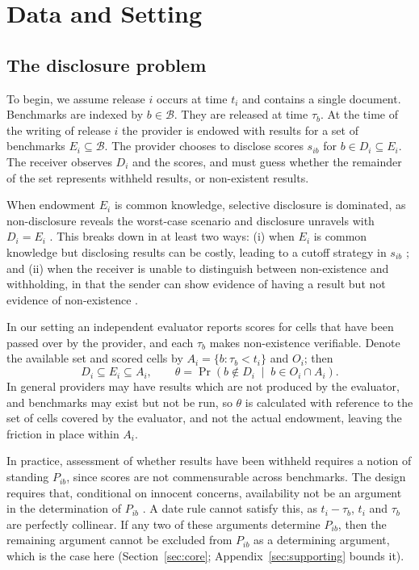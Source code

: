 \section{Data and Setting}\label{sec:data}

\subsection{The disclosure problem}\label{sec:data-model}

To begin, we assume release $i$ occurs at time $t_i$ and contains a single document. Benchmarks are indexed by $b \in \mathcal{B}$. They are released at time $\tau_b$. At the time of the writing of release $i$ the provider is endowed with results for a set of benchmarks $E_i \subseteq \mathcal{B}$. The provider chooses to disclose scores $s_{ib}$ for $b \in D_i \subseteq E_i$. The receiver observes $D_i$ and the scores, and must guess whether the remainder of the set represents withheld results, or non-existent results.

When endowment $E_i$ is common knowledge, selective disclosure is dominated, as non-disclosure reveals the worst-case scenario and disclosure unravels with $D_i = E_i$ \citep{grossman1981,milgrom1981}. This breaks down in at least two ways: (i) when $E_i$ is common knowledge but disclosing results can be costly, leading to a cutoff strategy in $s_{ib}$ \citep{verrecchia1983}; and (ii) when the receiver is unable to distinguish between non-existence and withholding, in that the sender can show evidence of having a result but not evidence of non-existence \citep[Section 3]{dye1985}.

In our setting an independent evaluator reports scores for cells that have been passed over by the provider, and each $\tau_b$ makes non-existence verifiable. Denote the available set and scored cells by $A_i = \{b : \tau_b < t_i\}$ and $O_i$; then
\[
D_i \subseteq E_i \subseteq A_i, \qquad \theta = \Pr\!\left(b \notin D_i \;\middle|\; b \in O_i \cap A_i\right).
\]
In general providers may have results which are not produced by the evaluator, and benchmarks may exist but not be run, so $\theta$ is calculated with reference to the set of cells covered by the evaluator, and not the actual endowment, leaving the \citet{dye1985} friction in place within $A_i$.

In practice, assessment of whether results have been withheld requires a notion of standing $P_{ib}$, since scores are not commensurable across benchmarks. The design requires that, conditional on innocent concerns, availability not be an argument in the determination of $P_{ib}$ \citep{heckman1979}. A date rule cannot satisfy this, as $t_i - \tau_b$, $t_i$ and $\tau_b$ are perfectly collinear. If any two of these arguments determine $P_{ib}$, then the remaining argument cannot be excluded from $P_{ib}$ as a determining argument, which is the case here (Section~\ref{sec:core}; Appendix~\ref{sec:supporting} bounds it).

